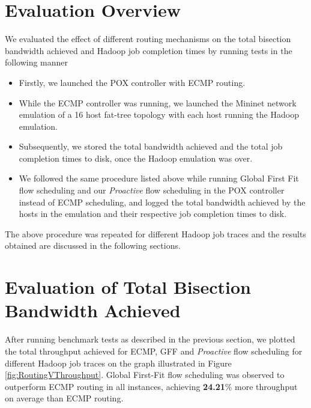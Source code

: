\section{Evaluation Overview} \label{sec:EvalOverview}
We evaluated the effect of different routing mechanisms on the total bisection bandwidth achieved and Hadoop job completion times by running tests in the following manner

\begin{itemize}
	\item Firstly, we launched the POX controller with ECMP routing.
	\item While the ECMP controller was running, we launched the Mininet network emulation of a 16 host fat-tree topology with each host running the Hadoop emulation. 
	\item Subsequently, we stored the total bandwidth achieved and the total job completion times to disk, once the Hadoop emulation was over.
	\item We followed the same procedure listed above while running Global First Fit flow scheduling and our \textit{Proactive} flow scheduling in the POX controller instead of ECMP scheduling, and logged the total bandwidth achieved by the hosts in the emulation and their respective job completion times to disk.    
\end{itemize}

The above procedure was repeated for different Hadoop job traces and the results obtained are discussed in the following sections. 

\section{Evaluation of Total Bisection Bandwidth Achieved} \label{sec:EvalBandwidth}

After running benchmark tests as described in the previous section, we plotted the total throughput achieved for ECMP, GFF and \textit{Proactive} flow scheduling for different Hadoop job traces on the graph illustrated in Figure \ref{fig:RoutingVThroughput}. Global First-Fit flow scheduling was observed to outperform ECMP routing in all instances, achieving \textbf{24.21}\% more throughput on average than ECMP routing.  

